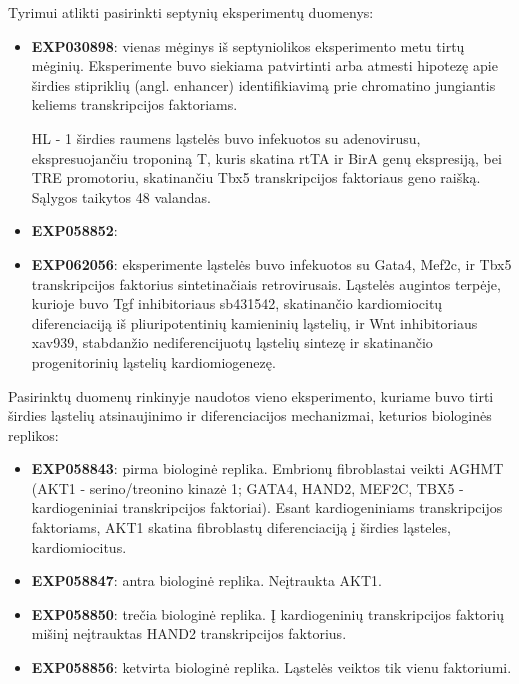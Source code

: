 \documentclass[12pt]{article}
\begin{document}
Tyrimui atlikti pasirinkti septynių eksperimentų duomenys:

\begin{itemize}
    \item \textbf{EXP030898}: vienas mėginys iš septyniolikos eksperimento
        metu tirtų mėginių. Eksperimente buvo siekiama patvirtinti arba
        atmesti hipotezę apie širdies stipriklių (angl. enhancer)
        identifikiavimą prie chromatino jungiantis keliems transkripcijos
        faktoriams.

        HL - 1 širdies raumens ląstelės buvo infekuotos
        su adenovirusu, ekspresuojančiu troponiną T, kuris skatina rtTA ir
        BirA genų ekspresiją, bei TRE promotoriu, skatinančiu Tbx5
        transkripcijos faktoriaus geno raišką. Sąlygos taikytos 48 valandas.
    \item \textbf{EXP058852}:
    \item \textbf{EXP062056}: eksperimente ląstelės buvo infekuotos su
        Gata4, Mef2c, ir Tbx5 transkripcijos faktorius sintetinačiais
        retrovirusais. Ląstelės augintos terpėje, kurioje buvo {Tgf\textbeta}
        inhibitoriaus sb431542, skatinančio kardiomiocitų diferenciaciją
        iš pliuripotentinių kamieninių ląstelių, ir Wnt inhibitoriaus
        xav939, stabdanžio nediferencijuotų ląstelių sintezę ir
        skatinančio progenitorinių ląstelių kardiomiogenezę.
\end{itemize}

Pasirinktų duomenų rinkinyje naudotos vieno eksperimento, kuriame buvo
tirti širdies ląstelių atsinaujinimo ir diferenciacijos mechanizmai,
keturios biologinės replikos:

\begin{itemize}
    \item \textbf{EXP058843}: pirma biologinė replika. Embrionų fibroblastai
        veikti AGHMT (AKT1 - serino/treonino kinazė 1; GATA4,
        HAND2, MEF2C, TBX5 - kardiogeniniai transkripcijos faktoriai). Esant
        kardiogeniniams transkripcijos faktoriams, AKT1 skatina fibroblastų
        diferenciaciją į širdies ląsteles, kardiomiocitus.
    \item \textbf{EXP058847}: antra biologinė replika. Neįtraukta AKT1.
    \item \textbf{EXP058850}: trečia biologinė replika. Į kardiogeninių
        transkripcijos faktorių mišinį neįtrauktas HAND2 transkripcijos
        faktorius.
    \item \textbf{EXP058856}: ketvirta biologinė replika. Ląstelės
        veiktos tik vienu faktoriumi.
  \end{itemize}
\newpage
\end{document}
